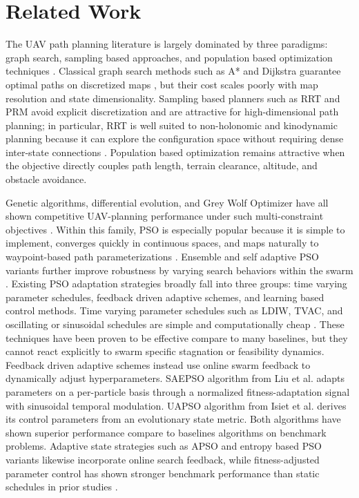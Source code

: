 \documentclass[final,5p,times]{elsarticle}
\begin{document}
\section{Related Work}
\label{sec:background} 
The UAV path planning literature is largely dominated by three paradigms: graph search, sampling based approaches, and population based optimization techniques \cite{AitSaadi2022UAV, Zhou2025A}.
Classical graph search methods such as A* and Dijkstra guarantee optimal paths on discretized maps \cite{Hart1968A}, but their cost scales poorly with map resolution and state dimensionality.
Sampling based planners such as RRT and PRM avoid explicit discretization and are attractive for high-dimensional path planning; in particular, RRT is well suited to non-holonomic and kinodynamic planning because it can explore the configuration space without requiring dense inter-state connections \cite{Karur2021A}.
Population based optimization remains attractive when the objective directly couples path length, terrain clearance, altitude, and obstacle avoidance.

Genetic algorithms, differential evolution, and Grey Wolf Optimizer have all shown competitive UAV-planning performance under such multi-constraint objectives \cite{Debnath2024An, AitSaadi2022UAV}.
Within this family, PSO is especially popular because it is simple to implement, converges quickly in continuous spaces, and maps naturally to waypoint-based path parameterizations \cite{Cheng2024Research, Phung2021Safetyenhanced}.
Ensemble and self adaptive PSO variants further improve robustness by varying search behaviors within the swarm \cite{Lynn2017Ensemble}.
Existing PSO adaptation strategies broadly fall into three groups: time varying parameter schedules, feedback driven adaptive schemes, and learning based control methods.
Time varying parameter schedules such as LDIW, TVAC, and oscillating or sinusoidal schedules are simple and computationally cheap \cite{Eberhart2000Comparing, Ratnaweera2004Selforganizing, Nickabadi2011A, Kentzoglanakis2009Particle, Chen2018A}.
These techniques have been proven to be effective compare to many baselines, but they cannot react explicitly to swarm specific stagnation or feasibility dynamics.
Feedback driven adaptive schemes instead use online swarm feedback to dynamically adjust hyperparameters.
SAEPSO algorithm from Liu et al. \cite{Liu2025A} adapts parameters on a per-particle basis through a normalized fitness-adaptation signal with sinusoidal temporal modulation.
UAPSO algorithm from Isiet et al. \cite{Isiet2019Selfadapting} derives its control parameters from an evolutionary state metric.
Both algorithms have shown superior performance compare to baselines algorithms on benchmark problems.
Adaptive state strategies such as APSO \cite{Zhan2009Adaptive} and entropy based PSO variants \cite{Han2022Improved} likewise incorporate online search feedback, while fitness-adjusted parameter control has shown stronger benchmark performance than static schedules in prior studies \cite{Li2017Particle}.
\end{document}
